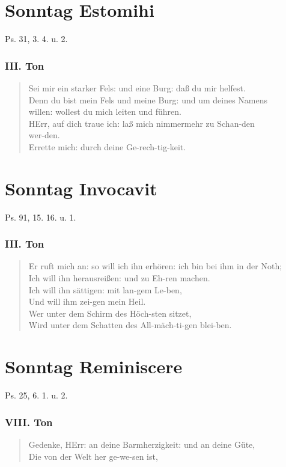 \section{Sonntag Estomihi}

Ps. 31, 3. 4. u. 2.

\subsubsection{III. Ton}
\begin{verse}
Sei mir ein starker Fels: und eine Burg: daß du mir helfest.\\
Denn du bist mein Fels und meine Burg: und um deines Namens\\
willen: wollest du mich leiten und führen.\\
HErr, auf dich traue ich: laß mich nimmermehr zu Schan-den\\
wer-den.\\
Errette mich: durch deine Ge-rech-tig-keit.
\end{verse}

\section{Sonntag Invocavit}

Ps. 91, 15. 16. u. 1.

\subsubsection{III. Ton}
\begin{verse}
Er ruft mich an: so will ich ihn erhören: ich bin bei ihm in der Noth;\\
Ich will ihn herausreißen: und zu Eh-ren machen.\\
Ich will ihn sättigen: mit lan-gem Le-ben,\\
Und will ihm zei-gen mein Heil.\\
Wer unter dem Schirm des Höch-sten sitzet,\\
Wird unter dem Schatten des All-mäch-ti-gen blei-ben.
\end{verse}

\section{Sonntag Reminiscere}

Ps. 25, 6. 1. u. 2.

\subsubsection{VIII. Ton}
\begin{verse}
Gedenke, HErr: an deine Barmherzigkeit: und an deine Güte,\\
Die von der Welt her ge-we-sen ist,
\end{verse}

